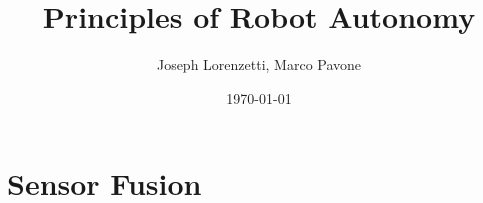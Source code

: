 \documentclass[nohyper,nobib]{tufte-book}
\title{Principles of Robot Autonomy}
\author{Joseph Lorenzetti, Marco Pavone}
\date{\today}
\begin{document}
\chapter{Sensor Fusion}


\printbibliography
\end{document}
